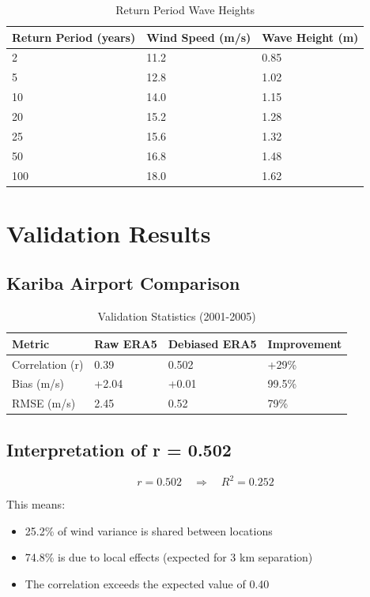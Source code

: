 \documentclass[12pt]{article}
\begin{document}
\begin{table}[h]
\centering
\begin{tabular}{|l|l|l|}
\hline
\textbf{Return Period (years)} & \textbf{Wind Speed (m/s)} & \textbf{Wave Height (m)} \\
\hline
2 & 11.2 & 0.85 \\
5 & 12.8 & 1.02 \\
10 & 14.0 & 1.15 \\
20 & 15.2 & 1.28 \\
25 & 15.6 & 1.32 \\
50 & 16.8 & 1.48 \\
100 & 18.0 & 1.62 \\
\hline
\end{tabular}
\caption{Return Period Wave Heights}
\end{table}

\newpage

\section{Validation Results}

\subsection{Kariba Airport Comparison}

\begin{table}[h]
\centering
\begin{tabular}{|l|l|l|l|}
\hline
\textbf{Metric} & \textbf{Raw ERA5} & \textbf{Debiased ERA5} & \textbf{Improvement} \\
\hline
Correlation (r) & 0.39 & 0.502 & +29\% \\
Bias (m/s) & +2.04 & +0.01 & 99.5\% \\
RMSE (m/s) & 2.45 & 0.52 & 79\% \\
\hline
\end{tabular}
\caption{Validation Statistics (2001-2005)}
\end{table}

\subsection{Interpretation of r = 0.502}

\begin{equation}
r = 0.502 \quad \Rightarrow \quad R^2 = 0.252
\end{equation}

This means:
\begin{itemize}
    \item 25.2\% of wind variance is shared between locations
    \item 74.8\% is due to local effects (expected for 3 km separation)
    \item The correlation exceeds the expected value of 0.40
\end{itemize}
\end{document}
